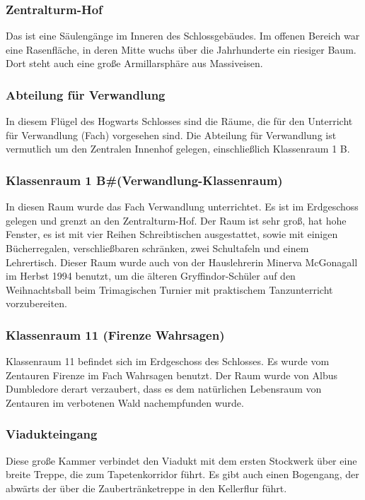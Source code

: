 \documentclass[a4paper, 10pt]{article}
\begin{document}
\subsubsection*{\large Zentralturm-Hof}
Das ist eine Säulengänge im Inneren des Schlossgebäudes. Im offenen Bereich war eine Rasenfläche, in deren Mitte wuchs über die Jahrhunderte ein riesiger Baum. Dort steht auch eine große Armillarsphäre aus Massiveisen.
\subsubsection*{\large Abteilung für Verwandlung}
In diesem Flügel des Hogwarts Schlosses sind die Räume, die für den Unterricht für Verwandlung (Fach) vorgesehen sind. Die Abteilung für Verwandlung ist vermutlich um den Zentralen Innenhof gelegen, einschließlich Klassenraum 1 B.
\subsubsection*{\large Klassenraum 1 B#(Verwandlung-Klassenraum)}
In diesen Raum wurde das Fach Verwandlung unterrichtet. Es ist im Erdgeschoss gelegen und grenzt an den Zentralturm-Hof. Der Raum ist sehr groß, hat hohe Fenster, es ist mit vier Reihen Schreibtischen ausgestattet, sowie mit einigen Bücherregalen, verschließbaren schränken, zwei Schultafeln und einem Lehrertisch. Dieser Raum wurde auch von der Hauslehrerin Minerva McGonagall im Herbst 1994 benutzt, um die älteren Gryffindor-Schüler auf den Weihnachtsball beim Trimagischen Turnier mit praktischem Tanzunterricht vorzubereiten.
\subsubsection*{\large Klassenraum 11 (Firenze Wahrsagen)}
Klassenraum 11 befindet sich im Erdgeschoss des Schlosses. Es wurde vom Zentauren Firenze im Fach Wahrsagen benutzt. Der Raum wurde von Albus Dumbledore derart verzaubert, dass es dem natürlichen Lebensraum von Zentauren im verbotenen Wald nachempfunden wurde.
\subsubsection*{\large Viadukteingang}
Diese große Kammer verbindet den Viadukt mit dem ersten Stockwerk über eine breite Treppe, die zum Tapetenkorridor führt. Es gibt auch einen Bogengang, der abwärts der über die Zaubertränketreppe in den Kellerflur führt.
\end{document}
